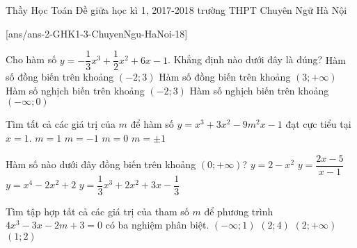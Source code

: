 
\begin{name}
{Thầy Học Toán}
{Đề giữa học kì 1, 2017-2018 trường THPT Chuyên Ngữ Hà Nội}
\end{name}
\setcounter{ex}{0}
[ans/ans-2-GHK1-3-ChuyenNgu-HaNoi-18]


\begin{ex}%
Cho hàm số $y=-\dfrac{1}{3}x^3+\dfrac{1}{2}x^2+6x-1$. Khẳng định nào dưới đây là đúng?
\choice
{\True Hàm số đồng biến trên khoảng $(-2;3)$}
{Hàm số đồng biến trên khoảng $(3;+\infty)$}
{Hàm số nghịch biến trên khoảng $(-2;3)$}
{Hàm số nghịch biến trên khoảng $(-\infty;0)$} 
\end{ex}

\begin{ex}%
Tìm tất cả các giá trị của $m$ để hàm số $y=x^3+3x^2-9m^2x-1$ đạt cực tiểu tại $x=1$.
\choice
{$m=1$}
{$m=-1$}
{$m=0$}
{\True $m=\pm 1$}
\end{ex}

\begin{ex}%
Hàm số nào dưới đây đồng biến trên khoảng $(0;+\infty)$?
\choice
{$y=2-x^2$}
{$y=\dfrac{2x-5}{x-1}$}
{$y=x^4-2x^2+2$}
{\True $y=\dfrac{1}{3}x^3+2x^2+3x-\dfrac{1}{3}$} 
\end{ex}

\begin{ex}%
Tìm tập hợp tất cả các giá trị của tham số $m$ để phương trình $4x^3-3x-2m+3=0$ có ba nghiệm phân biệt.
\choice
{$(-\infty;1)$}
{$(2;4)$}
{$(2;+\infty)$}
{\True $(1;2)$}
\end{ex}

